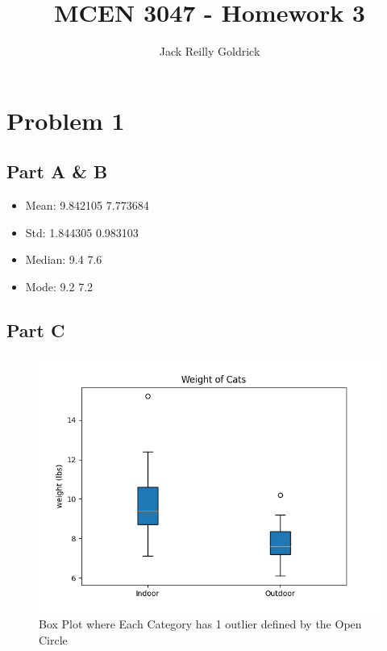 \documentclass[]{report}
\title{MCEN 3047 - Homework 3}
\author{Jack Reilly Goldrick}
\begin{document}
	\maketitle
	
\section{Problem 1}

\subsection{Part A \& B}
\begin{itemize}


\item Mean: 
	    9.842105
	     7.773684

\item Std: 
	     1.844305
	     0.983103

\item Median: 	
	   9.4
	  7.6

\item Mode: 
	  9.2
	 7.2

	
\end{itemize}

\subsection{Part C}

\begin{figure}[H]
	\centering
	\includegraphics[width=0.7\linewidth]{pics/1.c}
	\caption{Box Plot where Each Category has 1 outlier defined by the Open Circle}
	\label{fig:1}
\end{figure}
\end{document}
